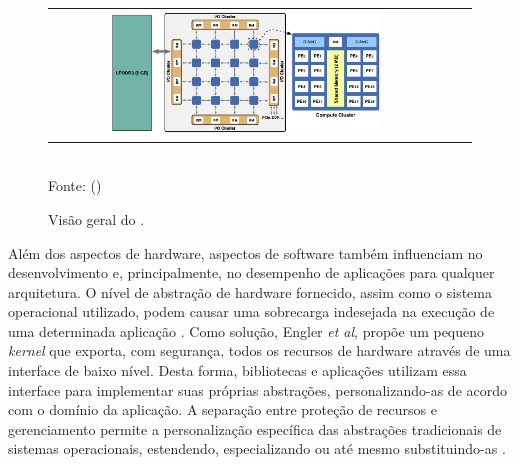 \documentclass[
	12pt,				%
	openright,			%
	twoside,			%
	a4paper,			%
	english,			%
	brazil,				%
	]{abntex2}
\begin{document}
\begin{figure}[t]
	\begin{center}
    	\caption{Visão geral do \mppa.}
           \label{figmppa}
		\begin{tabular}{ccc}
			\includegraphics[width=0.7\textwidth]{figs/mppa.png} \\
		\end{tabular}
      \vspace{1ex} \\
      Fonte: ()
     \end{center}
   \vspace{-2ex}
\end{figure}


Além dos aspectos de hardware, aspectos de software também influenciam no desenvolvimento e, principalmente, no desempenho de aplicações para qualquer arquitetura.
O nível de abstração de hardware fornecido, assim como o sistema operacional utilizado, podem causar uma sobrecarga indesejada na execução de uma determinada aplicação \cite{Appel:1991:VMP:106972.106984, Cao:1994:IPA:1267638.1267651, Harty:1992:APM:143365.143511, Krueger:1993:TDA:165854.165867, Stonebraker:1981:OSS:358699.358703, Levy:Exception}.
Como solução, Engler \textit{et al}, propõe um pequeno \textit{kernel} que exporta, com segurança, todos os recursos de hardware através de uma interface de baixo nível.
Desta forma, bibliotecas e aplicações utilizam essa interface para implementar suas próprias abstrações, personalizando-as de acordo com o domínio da aplicação.
A separação entre proteção de recursos e gerenciamento permite a personalização específica das abstrações tradicionais de sistemas operacionais, estendendo, especializando ou até mesmo substituindo-as \cite{engler_exokernel:_1995}.
\end{document}
